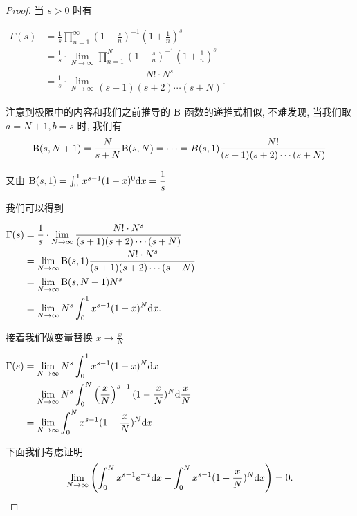 \begin{proof}
	当 $s>0$ 时有

	\begin{center}
		$
		\begin{aligned}
			\Gamma(s) &= \frac 1 s \prod\limits_{n=1}^\infty(1+\frac s n)^{-1}(1+\frac 1 n)^s \\
			&= \frac 1 s \cdot \lim\limits_{N\to \infty}\prod\limits_{n=1}^N (1+\frac s n)^{-1}(1+\frac 1 n)^s \\
			&= \frac 1 s \cdot \lim\limits_{N\to\infty}\dfrac{N!\cdot N^s}{(s+1)(s+2)\cdots(s+N)}.
		\end{aligned}
		$
	\end{center}

	注意到极限中的内容和我们之前推导的 $\text {B}$ 函数的递推式相似, 不难发现, 当我们取 $a=N+1,b=s$ 时, 我们有
	$$\text {B}(s,N+1)=\frac{N}{s+N}\text {B}(s,N)=\cdots=B(s,1)\dfrac{N!}{(s+1)(s+2)\cdots(s+N)}$$

	又由 $\text {B}(s,1)=\int_0^1 x^{s-1}(1-x)^0 \text {d} x=\dfrac 1 s$

	我们可以得到


	\begin{center}
		$
		\begin{aligned}
			\Gamma(s) &= \frac 1 s \cdot \lim\limits_{N\to\infty}\dfrac{N!\cdot N^s}{(s+1)(s+2)\cdots(s+N)}\\
			&= \lim\limits_{N\to \infty}\text {B}(s,1)\dfrac{N!\cdot N^s}{(s+1)(s+2)\cdots(s+N)}\\
			&= \lim\limits_{N\to \infty}\text {B}(s,N+1)N^s\\
			&= \lim\limits_{N\to \infty}N^s\int_0^1 x^{s-1}(1-x)^N\text {d} x.
		\end{aligned}
		$
	\end{center}

	接着我们做变量替换 $x\to\frac x N$
	\begin{center}
		$
		\begin{aligned}
			\Gamma(s) &= \lim\limits_{N\to \infty}N^s\int_0^1 x^{s-1}(1-x)^{N}\text {d} x\\
			&= \lim\limits_{N\to \infty}N^s\int_0^N \left(\frac x N\right)^{s-1}(1-\frac x N)^{N}\text {d} \frac x N\\
			&= \lim\limits_{N\to \infty} \int_0^N x^{s-1}(1-\frac x N)^N \text {d} x.
		\end{aligned}
		$
	\end{center}
	下面我们考虑证明 $$\lim\limits_{N\to \infty}\left(\int_0^N x^{s-1}e^{-x} \text {d} x - \int_0^N x^{s-1}(1-\frac x N)^N \text {d} x\right)=0.$$


\end{proof}
